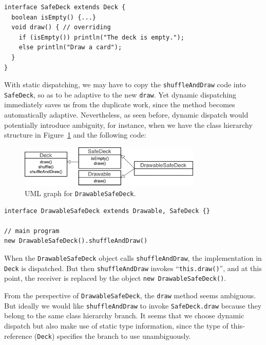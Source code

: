 \vspace{3pt}\begin{lstlisting}
interface SafeDeck extends Deck {
  boolean isEmpty() {...}
  void draw() { // overriding
    if (isEmpty()) println("The deck is empty.");
    else println("Draw a card");
  }
}
\end{lstlisting}\vspace{3pt}
With static dispatching, we may have to copy the \lstinline|shuffleAndDraw| code into \lstinline|SafeDeck|,
so as to be adaptive to the new \lstinline|draw|. Yet dynamic dispatching immediately saves us from the duplicate work,
since the method becomes automatically adaptive. Nevertheless, as seen before, dynamic dispatch would potentially introduce ambiguity,
for instance, when we have the class hierarchy structure in Figure~\ref{fig:drawablesafedeck} and the following code:

\begin{figure}[t]
	\saveSpaceFig
	\centering
	\includegraphics[height=2cm]{pics/DrawableSafeDeck.pdf}
	\caption{UML graph for \lstinline|DrawableSafeDeck|.}\label{fig:drawablesafedeck}
	\saveSpaceFig
\end{figure}

\vspace{3pt}\begin{lstlisting}
interface DrawableSafeDeck extends Drawable, SafeDeck {}

// main program
new DrawableSafeDeck().shuffleAndDraw()
\end{lstlisting}\vspace{3pt}
When the \lstinline|DrawableSafeDeck| object calls \lstinline|shuffleAndDraw|, the implementation in \lstinline|Deck|
is dispatched. But then \lstinline|shuffleAndDraw| invokes ``\lstinline|this.draw()|'', and at this point, the receiver
is replaced by the object \lstinline|new DrawableSafeDeck()|.

From the perspective of \lstinline|DrawableSafeDeck|, the \lstinline|draw| method seems ambiguous. But ideally we would
like \lstinline|shuffleAndDraw| to invoke \lstinline|SafeDeck.draw|
because they belong to the same class hierarchy branch. It
seems that we choose dynamic dispatch but also make use of static type
information, since the type of this-reference (\lstinline|Deck|)
specifies the branch to use unambiguously.

